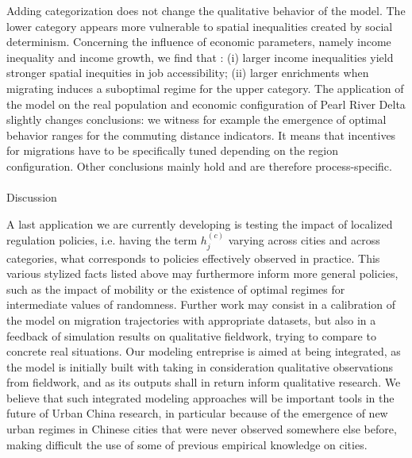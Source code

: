  Adding categorization does not change the qualitative behavior of the model. %
 The lower category appears more vulnerable to spatial inequalities created by social determinism. Concerning the influence of economic parameters, namely income inequality and income growth, we find that : (i) larger income inequalities yield stronger spatial inequities in job accessibility; (ii) larger enrichments when migrating induces a suboptimal regime for the upper category. The application of the model on the real population and economic configuration of Pearl River Delta slightly changes conclusions: we witness for example the emergence of optimal behavior ranges for the commuting distance indicators. It means that incentives for migrations have to be specifically tuned depending on the region configuration. Other conclusions mainly hold and are therefore process-specific.



\paragraph{}{Discussion}

A last application we are currently developing is testing the impact of localized regulation policies, i.e. having the term $h_j^{(c)}$ varying across cities and across categories, what corresponds to policies effectively observed in practice. This various stylized facts listed above may furthermore inform more general policies, such as the impact of mobility or the existence of optimal regimes for intermediate values of randomness. Further work may consist in a calibration of the model on migration trajectories with appropriate datasets, but also in a feedback of simulation results on qualitative fieldwork, trying to compare to concrete real situations. Our modeling entreprise is aimed at being integrated, as the model is initially built with taking in consideration qualitative observations from fieldwork, and as its outputs shall in return inform qualitative research. We believe that such integrated modeling approaches will be important tools in the future of Urban China research, in particular because of the emergence of new urban regimes in Chinese cities that were never observed somewhere else before, making difficult the use of some of previous empirical knowledge on cities.






